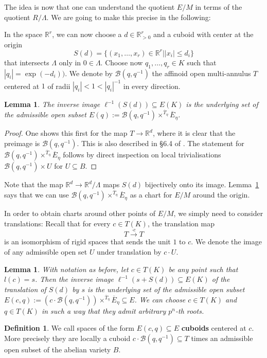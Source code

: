 \documentclass[11pt,oneside]{amsart}
\newtheorem{lemma}[theorem]{Lemma}
\theoremstyle{definition}
\newtheorem{definition}[theorem]{Definition}
\theoremstyle{remark}
\begin{document}
	The idea is now that one can understand the quotient $E/M$ in terms of the quotient $R/\Lambda$. We are going to make this precise in the following:
	
	In the space $\mathbb R^r$, we can now choose a $d\in \mathbb R_{> 0}^r$ and a cuboid with center at the origin
	\[S(d) = \{(x_1,\dots,x_r)\in \mathbb R^r | |x_i|\leq d_i \}\]
	that intersects $\Lambda$ only in $0\in \Lambda$.
	Choose now $q_1,\dots,q_r\in K$ such that $|q_i|=\exp(-d_i))$. We denote by $\mathcal B(q,q^{-1})$ the affinoid open multi-annulus $T$ centered at $1$ of radii $|q_i|< 1 < |q_i|^{-1}$ in every direction.
	
	\begin{lemma}\label{cube around origin gives local chart for E/M}
		The inverse image $\ell^{-1}(S(d))\subseteq E(K)$ is the underlying set of the admissible open subset $E(q):=\mathcal B(q,q^{-1})\times^{\overline{T}_\eta}\overline{E}_\eta$.
	\end{lemma}
	\begin{proof}
		One shows this first for the map $T\rightarrow \mathbb R^d$, where it is clear that the preimage is $\mathcal B(q,q^{-1})$. This is also described in \S 6.4 of \cite{FvdP}. The statement for $\mathcal B(q,q^{-1})\times^{\overline{T}_\eta}\overline{E}_\eta$ follows by direct inspection on local trivialisations $\mathcal B(q,q^{-1})\times U$ for $U\subseteq B$.
	\end{proof}
	
	
	Note that the map $\mathbb R^d\rightarrow \mathbb R^d/\Lambda$ maps $S(d)$ bijectively onto its image. 
	Lemma~\ref{cube around origin gives local chart for E/M} says that we can use $\mathcal B(q,q^{-1})\times^{\overline{T}_\eta}\overline{E}_\eta$ as a chart for $E/M$ around the origin.
	
	In order to obtain charts around other points of $E/M$, we simply need to consider translations: Recall that for every $c\in T(K)$, the translation map
	\[T\xrightarrow{\cdot c}T\]
	is an isomorphism of rigid spaces that sends the unit $1$ to $c$. We denote the image of any admissible open set $U$ under translation by $c\cdot U$.
	
	\begin{lemma}\label{cube around point gives local chart for E/M}
		With notation as before, let $c \in T(K)$ be any point such that $l(c)=s$. Then the inverse image $\ell^{-1}(s+S(d))\subseteq E(K)$ of the translation of $S(d)$ by $s$ is the underlying set of the admissible open subset $E(c,q) := (c\cdot \mathcal B(q,q^{-1}))\times^{\overline{T}_\eta}\overline{E}_\eta \subseteq E$. We can choose $c\in T(K)$ and $q\in T(K)$ in such a way that they admit arbitrary $p^n$-th roots.
	\end{lemma}
	\begin{definition}\label{defininition of cuboid}
		We call spaces of the form $E(c,q)\subseteq E$ \textbf{cuboids} centered at $c$. More precisely they are locally a cuboid   $c\cdot\mathcal B(q,q^{-1})\subseteq T$ times an admissible open subset of the abelian variety $B$. 
	\end{definition}
	
\end{document}
